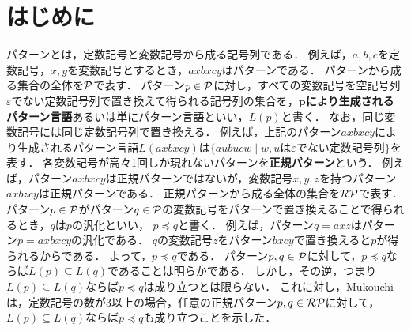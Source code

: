 \section{はじめに}
パターンとは，定数記号と変数記号から成る記号列である．
例えば，$a,b,c$を定数記号，$x,y$を変数記号とするとき，$axbxcy$はパターンである．
パターンから成る集合の全体を$\mathcal P$で表す．
パターン$p\in \mathcal P$に対し，すべての変数記号を空記号列$\varepsilon$でない定数記号列で置き換えて得られる記号列の集合を，\textbf{$\bm{p}$により生成されるパターン言語}あるいは単にパターン言語といい，$L(p)$と書く．
なお，同じ変数記号には同じ定数記号列で置き換える．
例えば，上記のパターン$axbxcy$により生成されるパターン言語$L(axbxcy)$は$\{ aubucw \mid w,u\mbox{は$\varepsilon$でない定数記号列} \}$を表す．
各変数記号が高々1回しか現れないパターンを\textbf{正規パターン}という．
例えば，パターン$axbxcy$は正規パターンではないが，変数記号$x,y,z$を持つパターン$axbzcy$は正規パターンである．
正規パターンから成る全体の集合を$\mathcal{RP}$で表す．
パターン$p\in \mathcal P$がパターン$q\in\mathcal P$の変数記号をパターンで置き換えることで得られるとき，$q$は$p$の汎化といい，
$p\preceq q$と書く．
例えば，パターン$q=axz$はパターン$p=axbxcy$の汎化である．
$q$の変数記号$z$をパターン$bxcy$で置き換えると$p$が得られるからである．
よって，$p\preceq q$である．
パターン$p,q\in \mathcal P$に対して，$p\preceq q$ならば$L(p)\subseteq L(q)$であることは明らかである．
しかし，その逆，つまり$L(p)\subseteq L(q)$ならば$p\preceq q$は成り立つとは限らない．
これに対し，Mukouchi\cite{Mukouchi1991}は，定数記号の数が3以上の場合，任意の正規パターン$p,q\in \mathcal{RP}$に対して，
$L(p)\subseteq L(q)$ならば$p\preceq q$も成り立つことを示した．

